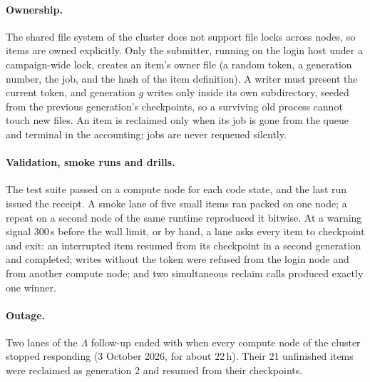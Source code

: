 \paragraph{Ownership.} The shared file system of the cluster does not support file locks across nodes, so items are owned
explicitly. Only the submitter, running on the login host under a campaign-wide lock, creates an item's owner file (a random token,
a generation number, the job, and the hash of the item definition). A writer must present the current token, and generation $g$
writes only inside its own subdirectory, seeded from the previous generation's checkpoints, so a surviving old process cannot touch
new files. An item is reclaimed only when its job is gone from the queue and terminal in the accounting; jobs are never requeued
silently.

\paragraph{Validation, smoke runs and drills.} The test suite passed on a compute node for each code state, and the last run issued
the receipt. A smoke lane of five small items ran packed on one node; a repeat on a second node of the same runtime reproduced it
bitwise. At a warning signal 300\,s before the wall limit, or by hand, a lane asks every item to checkpoint and exit: an interrupted
item resumed from its checkpoint in a second generation and completed; writes without the token were refused from the login node and
from another compute node; and two simultaneous reclaim calls produced exactly one winner.

\paragraph{Outage.} Two lanes of the $\Lambda$ follow-up ended with  when every compute node of the cluster stopped
responding (3 October 2026, for about 22\,h). Their 21 unfinished items were reclaimed as generation 2 and resumed from their
checkpoints.

\begin{table}[ht]\centering\scriptsize
\caption{Every job of the study (node names anonymized). Thread-h is the sum over items of wall time times threads, from the lane
logs; each job held a whole node for its elapsed time.}\label{nrg:tab:resources}

\end{table}

